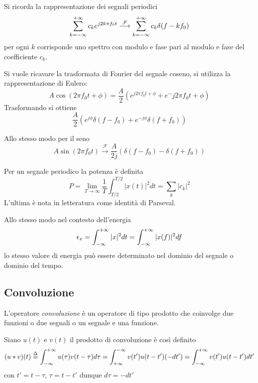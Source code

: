 
Si ricorda la rappresentazione dei segnali periodici
$$
\sum_{k=-\infty}^{+\infty}  c_ke^{j2k\pi f_0 t} \stackrel{\mathcal{F}}{\longrightarrow} \sum_{k=-\infty}^{+\infty}
c_k \delta(f-kf_0)
$$
per ogni $k$ corrisponde uno spettro con modulo e fase pari al modulo e fase
del coefficiente $c_k$.

Si vuole ricavare la trasformata di Fourier del segnale coseno, si utilizza la
rappresentazione di Eulero:
$$
A\cos (2\pi f_0 t + \phi) = \frac{A}{2} \left( e^{j2\pi f_0 t + \phi} +
e^-{j2\pi f_0 t + \phi}\right)
$$
Trasformando si ottiene
$$
\frac{A}{2} \left( e^{j\phi} \delta(f-f_0) + e^{-j\phi}\delta(f+f_0) \right)
$$

Allo stesso modo per il seno
$$
A\sin(2\pi f_0 t) \stackrel{\mathcal{F}}{\longrightarrow}
\frac{A}{2j}\left( \delta(f-f_0) - \delta(f+f_0)\right)
$$


Per un segnale periodico la potenza è definita
$$
P = \lim_{T\to \infty} \frac{1}{T} \int_{T/2}^{T/2} |x(t)|^2 dt = \sum_k |c_k|^2
$$
L'ultima è nota in letteratura come identità di Parseval.

Allo stesso modo nel contesto dell'energia
$$
\epsilon_x = \int_{-\infty}^{+\infty} |x|^2 dt = \int_{-\infty}^{+\infty} |x(f)|^2 df
$$
lo stesso valore di energia può essere determinato nel dominio del segnale o
dominio del tempo.






\subsection{Convoluzione}
L'operatore \textit{convoluzione} è un operatore di tipo prodotto che coinvolge
due funzioni o due segnali o un segnale e una funzione.

Siano $u(t)$ e $v(t)$ il prodotto di convoluzione è così definito
\begin{equation}
 (u\ast v) (t) \stackrel{\Delta}{=} \int_{-\infty}^{+\infty} u(\tau)v(t-\tau)d\tau =
\int_{+\infty}^{-\infty} v(t')u(t-t')(-dt') = \int_{-\infty}^{+\infty} v(t')u(t-t') dt'
\end{equation}
con $t' = t-\tau$, $\tau = t-t'$ dunque $d\tau = -dt'$

